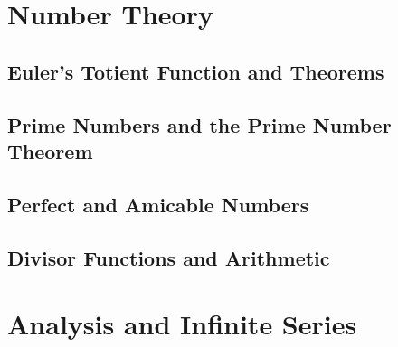 \documentclass[11pt,a4paper,twoside]{book}
\theoremstyle{eulerstyle}
\theoremstyle{definition}
\begin{document}
\cleardoublepage

\mainmatter

\part{Number Theory}
\parttoc

\chapter{Euler's Totient Function and Theorems}
\label{ch:totient}


\cleardoublepage

\chapter{Prime Numbers and the Prime Number Theorem}
\label{ch:primes}


\cleardoublepage

\chapter{Perfect and Amicable Numbers}
\label{ch:perfect_amicable}


\cleardoublepage

\chapter{Divisor Functions and Arithmetic}
\label{ch:divisors}
%

\cleardoublepage

\part{Analysis and Infinite Series}
\parttoc
\end{document}
